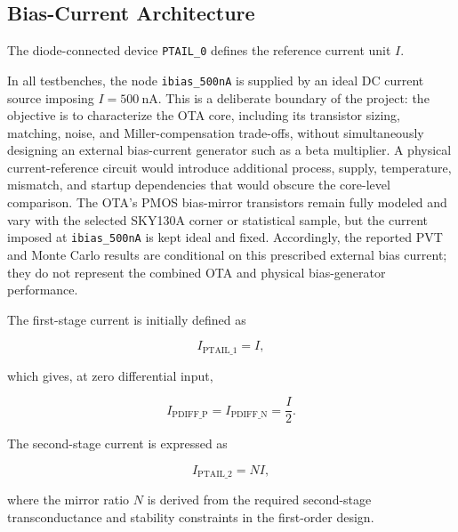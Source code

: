 \subsection{Bias-Current Architecture}

The diode-connected device \texttt{PTAIL\_0} defines the reference
current unit $I$.

In all testbenches, the node \texttt{ibias\_500nA} is supplied by an
ideal DC current source imposing $I=500~\mathrm{nA}$. This is a
deliberate boundary of the project: the objective is to characterize
the OTA core, including its transistor sizing, matching, noise, and
Miller-compensation trade-offs, without simultaneously designing an
external bias-current generator such as a beta multiplier. A physical
current-reference circuit would introduce additional process, supply,
temperature, mismatch, and startup dependencies that would obscure the
core-level comparison. The OTA's PMOS bias-mirror transistors remain
fully modeled and vary with the selected SKY130A corner or statistical
sample, but the current imposed at \texttt{ibias\_500nA} is kept ideal
and fixed. Accordingly, the reported PVT and Monte Carlo results are
conditional on this prescribed external bias current; they do not
represent the combined OTA and physical bias-generator performance.

The first-stage current is initially defined as

\[
I_{\mathrm{PTAIL\_1}} = I,
\]

which gives, at zero differential input,

\[
I_{\mathrm{PDIFF\_P}}
=
I_{\mathrm{PDIFF\_N}}
=
\frac{I}{2}.
\]

The second-stage current is expressed as

\[
I_{\mathrm{PTAIL\_2}} = N I,
\]

where the mirror ratio $N$ is derived from the required second-stage
transconductance and stability constraints in the first-order design.

